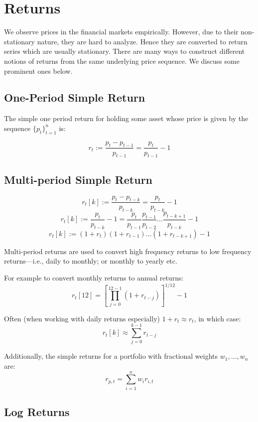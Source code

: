\documentclass[11pt,]{article}
\begin{document}
\section{Returns}\label{returns}

We observe prices in the financial markets empirically. However, due to
their non-stationary nature, they are hard to analyze. Hence they are
converted to return series which are usually stationary. There are many
ways to construct different notions of returns from the same underlying
price sequence. We discuss some prominent ones below.

\subsection{One-Period Simple Return}\label{one-period-simple-return}

The simple one period return for holding some asset whose price is given
by the sequence \(\{p_t\}_{t=1}^n\) is:

\[r_t := \frac{p_t-p_{t-1}}{p_{t-1}} = \frac{p_t}{p_{t-1}}-1\]

\subsection{Multi-period Simple
Return}\label{multi-period-simple-return}

\[r_t[k] := \frac{p_t-p_{t-k}}{p_{t-k}} = \frac{p_t}{p_{t-k}}-1\]
\[r_t[k] := \frac{p_t}{p_{t-k}}-1 = 
\frac{p_t}{p_{t-1}}\frac{p_{t-1}}{p_{t-2}}\hdots\frac{p_{t-k+1}}{p_{t-k}}-1\]
\[r_t[k] := (1+r_t)(1+r_{t-1})\hdots(1+r_{t-k+1})-1\]

Multi-period returns are used to convert high frequency returns to low
frequency returns---i.e., daily to monthly; or monthly to yearly etc.

For example to convert monthly returns to annual returns:
\[r_{t}[12]= [\prod_{j=0}^{12-1}(1+r_{t-j})]^{1/12}-1\]

Often (when working with daily returns especially) \(1+r_t\approx r_t\),
in which case: \[r_t[k]\approx \sum_{j=0}^{k-1}r_{t-j}\]

Additionally, the simple returns for a portfolio with fractional weights
\(w_1,\hdots,w_n\) are: \[r_{p,t}=\sum_{i=1}^n w_ir_{i,t}\]

\subsection{Log Returns}\label{log-returns}
\end{document}
